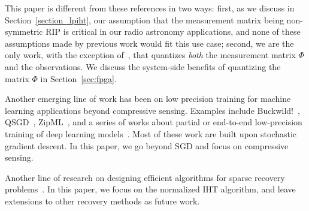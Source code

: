 \documentclass{article}
\begin{document}
{This paper is different from these references
in two ways: first, as we discuss in Section~\ref{section_lpiht},
our assumption that the measurement matrix being
non-symmetric RIP is critical in our radio astronomy applications, 
and none of these assumptions made by previous work would fit  this use case; second, we are the only work,
with the exception of~\cite{gopi20131bitcs}, that quantizes
{\em both} the measurement matrix $\Phi$ and the observations.
We discuss the system-side benefits  
of quantizing the matrix $\Phi$ in Section~\ref{sec:fpga}.
} 



Another emerging line of work has been on low precision training for 
machine learning applications beyond compressive
sensing. Examples include Buckwild!~\cite{desa2015hogwild},
QSGD~\cite{alistarh2016qsgd},  
ZipML~\cite{zhang2017zipml}, and
a series of works about 
partial or end-to-end low-precision training 
of deep learning models~\cite{seide2014sgd1bit, hubara2016qsnn, rastegari2016binarycnn,zhou2016cnn, miyashita2016cnn, li2016twn, gupta2015dl}.
Most of these work are built upon stochastic gradient descent. In this paper, we 
go beyond SGD and focus on  compressive sensing.



Another line of research on 
designing efficient algorithms for sparse recovery problems~\cite{blumensath2011aiht, wei2015fiht, blanchard2013iht, cevher2011ht, liu2017dualiht}. In this paper, we focus on the normalized IHT algorithm, and leave extensions to other recovery methods as future work.




\end{document}
